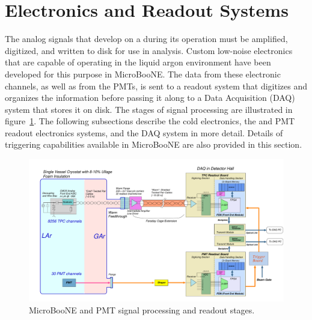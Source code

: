 \section{Electronics and Readout Systems}
\label{sec:electronics}

The analog signals that develop on a \lartpc during its operation must be amplified, digitized, and written to disk for use in analysis.  Custom low-noise electronics that are capable of operating in the liquid argon environment have been developed for this purpose in MicroBooNE.  The data from these \lartpc electronic channels, as well as from the PMTs, is sent to a readout system that digitizes and organizes the information before passing it along to a Data Acquisition (DAQ) system that stores it on disk.  The stages of signal processing are illustrated in figure~\ref{readout_1}.  The following subsections describe the \lartpc cold electronics, the \lartpc and PMT readout electronics systems, and the DAQ system in more detail.  Details of triggering capabilities available in MicroBooNE are also provided in this section.

\begin{figure}
\centering
\includegraphics[width=0.9\linewidth]{./figures/MicroBooNEReadoutScheme.pdf}%
\caption{\label{readout_1}MicroBooNE \lartpc and PMT signal processing and readout stages.}
\end{figure}




